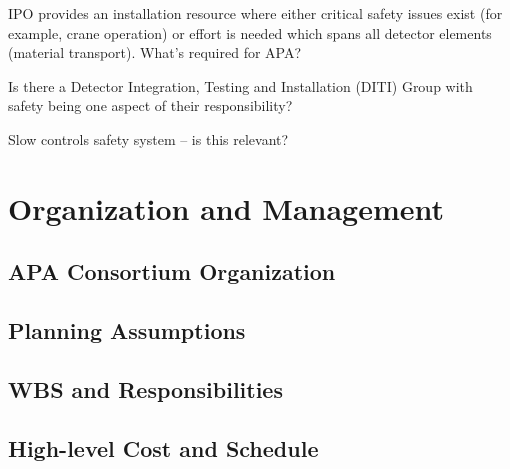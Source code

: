 IPO provides an installation resource where either critical safety issues exist (for example,  crane	
operation) or effort is needed which spans all	detector elements (material transport). What's required for APA?

Is there a Detector Integration, Testing and Installation (DITI) Group with safety being one aspect of their responsibility?

Slow controls safety system -- is this relevant?






\section{Organization and Management}
\label{sec:fdsp-apa-org}

\subsection{APA Consortium Organization}
\label{sec:fdsp-apa-org-consortium}


\subsection{Planning Assumptions}
\label{sec:fdsp-apa-org-assmp}


\subsection{WBS and Responsibilities}
\label{sec:fdsp-apa-org-wbs}

\subsection{High-level Cost and Schedule}
\label{sec:fdsp-apa-org-cs}


















